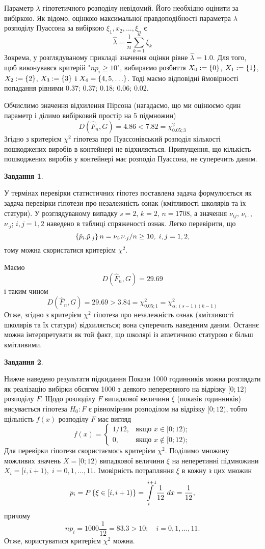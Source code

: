 \documentclass[12pt]{article} %
\newtheorem{prob}{Завдання}
\begin{document}
	Параметр $\lambda$ гіпотетичного розподілу невідомий. Його необхідно оцінити за вибіркою. Як відомо, оцінкою максимальної правдоподібності
	параметра $\lambda$ розподілу Пуассона за вибіркою $\xi_1,x_2,\hdots,\xi_n$ є
	\[\hat{\lambda}=\frac{1}{n}\sum_{k=1}^n\xi_k\]
	Зокрема, у розглядуваному прикладі значення оцінки рівне $\hat{\lambda}=1.0$. Для того, щоб виконувався критерій "$np_i\geq10$",
	вибираємо розбиття $X_0:=\left\{0\right\}$, $X_1:=\left\{1\right\}$, $X_2:=\left\{2\right\}$, $X_3:=\left\{3\right\}$ і $X_4=\left\{4,5,\hdots\right\}$. Тоді маємо 
	відповідні ймовірності попадання рівними 0.37; 0.37; 0.18; 0.06; 0.02.

	Обчислимо значення відхилення Пірсона (нагадаємо, що ми оцінюємо один параметр і ділимо вибірковий простір на 5 підмножин)
	\[D(\hat{F}_n,G)=4.86<7.82=\chi^2_{0.05;3}\]
	Згідно з критерієм $\chi^2$ гіпотеза про Пуассонівський розподіл кількості пошкоджених виробів в контейнері не відхиляється. Припущення,
	що кількість пошкоджених виробів у контейнері має розподіл Пуассона, не суперечить даним.
\begin{prob}\end{prob}
	У термінах перевірки статистичних гіпотез поставлена задача формулюється як задача перевірки гіпотези про незалежність ознак
	(кмітливості школярів та їх статури). У розглядуваному випадку $s=2$, $k=2$, $n=1708$, а значення $\nu_{ij}$, $\nu_{i\cdot}$,
	$\nu_{\cdot j}$; $i,j=1,2$ наведено в таблиці спряженості ознак. Легко перевірити, що
	\[\left\{\hat{p}_{i\cdot}\hat{p}_{\cdot j}\right\}n=\nu_{i\cdot}\nu_{\cdot j}/n\geq10,\;i,j=1,2,\]
	тому можна скористатися критерієм $\chi^2$. 
	
	Маємо
	\[D(\hat{F}_n,G)=29.69\]
	і таким чином
	\[D(\hat{F}_n,G)=29.69>3.84=\chi^2_{0.05;1}=\chi^2_{\alpha;(s-1)(k-1)}\]
	Отже, згідно з критерієм $\chi^2$ гіпотеза про незалежність ознак (кмітливості школярів та їх статури) відхиляється; вона
	суперечить наведеним даним. Останнє можна інтерпретувати як той факт, що школярі із атлетичною статурою є більш кмітливими.
\setcounter{prob}{47}
\begin{prob}\end{prob}
	Нижче наведено результати підкидання 
	Покази 1000 годинників можна розглядати як реалізацію вибірки обсягом 1000 з деякого неперервного на відрізку $[0;12)$ розподілу $F$. Щодо
	розподілу $F$ випадкової величини $\xi$ (показів годинників) висувається гіпотеза $H_0:F$ є рівномірним розподілом на відрізку $[0;12)$,
	тобто щільність $f(x)$ розподілу $F$ має вигляд
	\[f(x)=\left\{\begin{array}{cr}1/12,&\mbox{якщо }x\in[0;12);\\0,&\mbox{якщо }x\notin[0;12);\end{array}\right.\]
	Для перевірки гіпотези скористаємось критерієм $\chi^2$. Поділимо множину можливих значень $X=[0;12)$ випадкової величини $\xi$ на
	неперетинні підмножини $X_i=[i,i+1),\;i=0,1,\hdots,11$. Імовірність потрапляння $\xi$ в кожну з цих множин
	\[p_i=P\mycbra{\xi\in[i,i+1)}=\int_i^{i+1}\frac{1}{12}\;dx=\frac{1}{12},\]
	причому
	\[np_i=1000\frac{1}{12}=83.3>10;\quad i=0,1,\hdots,11.\]
	Отже, користуватися критерієм $\chi^2$ можна.
\end{document}
